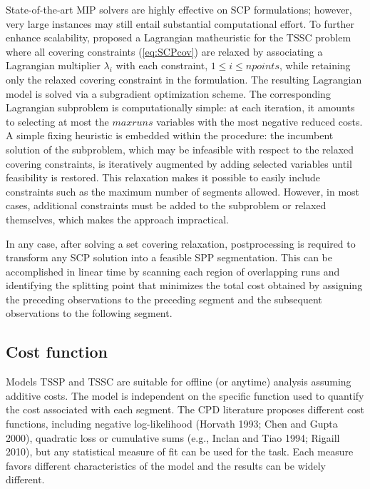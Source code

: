 \documentclass[preprints,article,submit,pdftex,moreauthors]{Definitions/mdpi}
\begin{document}
State-of-the-art MIP solvers are highly effective on SCP formulations; however, very large instances may still entail substantial computational effort. To further enhance scalability, \cite{M24} proposed a Lagrangian matheuristic \cite{the_book} for the TSSC problem where  all covering constraints (\ref{eq:SCPcov}) are relaxed by associating a Lagrangian multiplier $\lambda_i$ with each constraint, $1 \leq i \leq npoints$, while retaining only the relaxed covering constraint in the formulation. 
The resulting Lagrangian model is solved via a subgradient optimization scheme. The corresponding Lagrangian subproblem is computationally simple: at each iteration, it amounts to selecting at most the $maxruns$ variables with the most negative reduced costs. A simple fixing heuristic is embedded within the procedure: the incumbent solution of the subproblem, which may be infeasible with respect to the relaxed covering constraints, is iteratively augmented by adding selected variables until feasibility is restored. This relaxation makes it possible to easily include constraints such as the maximum number of segments allowed. However, in most cases, additional constraints must be added to the subproblem or relaxed themselves, which makes the approach impractical.

In any case, after solving a set covering relaxation, postprocessing is required to transform any SCP solution into a feasible SPP segmentation. This can be accomplished in linear time by scanning each region of overlapping runs and identifying the splitting point that minimizes the total cost obtained by assigning the preceding observations to the preceding segment and the subsequent observations to the following segment.

\subsection{Cost function}	\label{subsec:costfunc}

Models TSSP and TSSC are suitable for offline (or anytime) analysis assuming additive costs. The model is independent on the specific function used to quantify the cost associated with each segment. The CPD literature proposes different cost functions, including negative log-likelihood (Horvath 1993; Chen and Gupta 2000), quadratic loss or cumulative sums (e.g., Inclan and Tiao 1994; Rigaill 2010), but any statistical measure of fit can be used for the task. Each measure favors different characteristics of the model and the results can be widely different.
\end{document}
